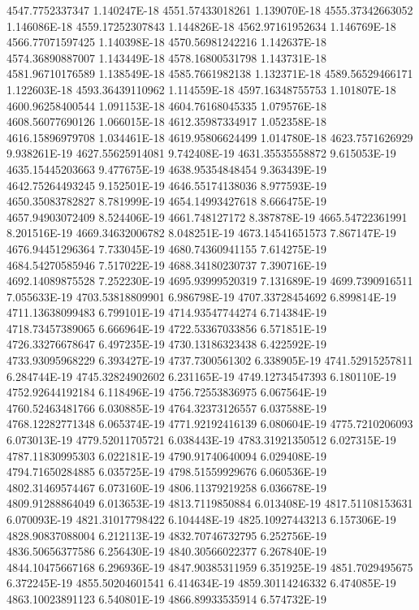 4547.7752337347  1.140247E-18
4551.57433018261  1.139070E-18
4555.37342663052  1.146086E-18
4559.17252307843  1.144826E-18
4562.97161952634  1.146769E-18
4566.77071597425  1.140398E-18
4570.56981242216  1.142637E-18
4574.36890887007  1.143449E-18
4578.16800531798  1.143731E-18
4581.96710176589  1.138549E-18
4585.7661982138  1.132371E-18
4589.56529466171  1.122603E-18
4593.36439110962  1.114559E-18
4597.16348755753  1.101807E-18
4600.96258400544  1.091153E-18
4604.76168045335  1.079576E-18
4608.56077690126  1.066015E-18
4612.35987334917  1.052358E-18
4616.15896979708  1.034461E-18
4619.95806624499  1.014780E-18
4623.7571626929  9.938261E-19
4627.55625914081  9.742408E-19
4631.35535558872  9.615053E-19
4635.15445203663  9.477675E-19
4638.95354848454  9.363439E-19
4642.75264493245  9.152501E-19
4646.55174138036  8.977593E-19
4650.35083782827  8.781999E-19
4654.14993427618  8.666475E-19
4657.94903072409  8.524406E-19
4661.748127172  8.387878E-19
4665.54722361991  8.201516E-19
4669.34632006782  8.048251E-19
4673.14541651573  7.867147E-19
4676.94451296364  7.733045E-19
4680.74360941155  7.614275E-19
4684.54270585946  7.517022E-19
4688.34180230737  7.390716E-19
4692.14089875528  7.252230E-19
4695.93999520319  7.131689E-19
4699.7390916511  7.055633E-19
4703.53818809901  6.986798E-19
4707.33728454692  6.899814E-19
4711.13638099483  6.799101E-19
4714.93547744274  6.714384E-19
4718.73457389065  6.666964E-19
4722.53367033856  6.571851E-19
4726.33276678647  6.497235E-19
4730.13186323438  6.422592E-19
4733.93095968229  6.393427E-19
4737.7300561302  6.338905E-19
4741.52915257811  6.284744E-19
4745.32824902602  6.231165E-19
4749.12734547393  6.180110E-19
4752.92644192184  6.118496E-19
4756.72553836975  6.067564E-19
4760.52463481766  6.030885E-19
4764.32373126557  6.037588E-19
4768.12282771348  6.065374E-19
4771.92192416139  6.080604E-19
4775.7210206093  6.073013E-19
4779.52011705721  6.038443E-19
4783.31921350512  6.027315E-19
4787.11830995303  6.022181E-19
4790.91740640094  6.029408E-19
4794.71650284885  6.035725E-19
4798.51559929676  6.060536E-19
4802.31469574467  6.073160E-19
4806.11379219258  6.036678E-19
4809.91288864049  6.013653E-19
4813.7119850884  6.013408E-19
4817.51108153631  6.070093E-19
4821.31017798422  6.104448E-19
4825.10927443213  6.157306E-19
4828.90837088004  6.212113E-19
4832.70746732795  6.252756E-19
4836.50656377586  6.256430E-19
4840.30566022377  6.267840E-19
4844.10475667168  6.296936E-19
4847.90385311959  6.351925E-19
4851.7029495675  6.372245E-19
4855.50204601541  6.414634E-19
4859.30114246332  6.474085E-19
4863.10023891123  6.540801E-19
4866.89933535914  6.574732E-19
